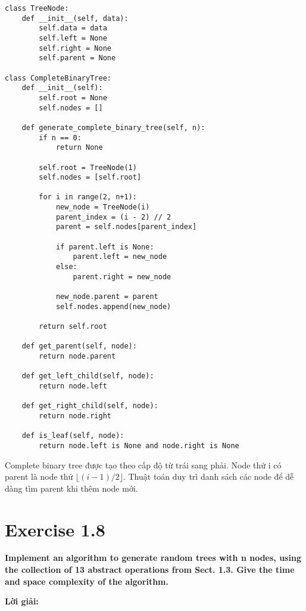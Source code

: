 \documentclass[12pt]{article}
\begin{document}
\begin{lstlisting}
class TreeNode:
    def __init__(self, data):
        self.data = data
        self.left = None
        self.right = None
        self.parent = None

class CompleteBinaryTree:
    def __init__(self):
        self.root = None
        self.nodes = []
    
    def generate_complete_binary_tree(self, n):
        if n == 0:
            return None
        
        self.root = TreeNode(1)
        self.nodes = [self.root]
        
        for i in range(2, n+1):
            new_node = TreeNode(i)
            parent_index = (i - 2) // 2
            parent = self.nodes[parent_index]
            
            if parent.left is None:
                parent.left = new_node
            else:
                parent.right = new_node
            
            new_node.parent = parent
            self.nodes.append(new_node)
        
        return self.root
    
    def get_parent(self, node):
        return node.parent
    
    def get_left_child(self, node):
        return node.left
    
    def get_right_child(self, node):
        return node.right
    
    def is_leaf(self, node):
        return node.left is None and node.right is None
\end{lstlisting}

Complete binary tree được tạo theo cấp độ từ trái sang phải. Node thứ i có parent là node thứ $\lfloor(i-1)/2\rfloor$. Thuật toán duy trì danh sách các node để dễ dàng tìm parent khi thêm node mới.

\section{Exercise 1.8}
\textbf{Implement an algorithm to generate random trees with n nodes, using the collection of 13 abstract operations from Sect. 1.3. Give the time and space complexity of the algorithm.}

\textbf{Lời giải:}
\end{document}
